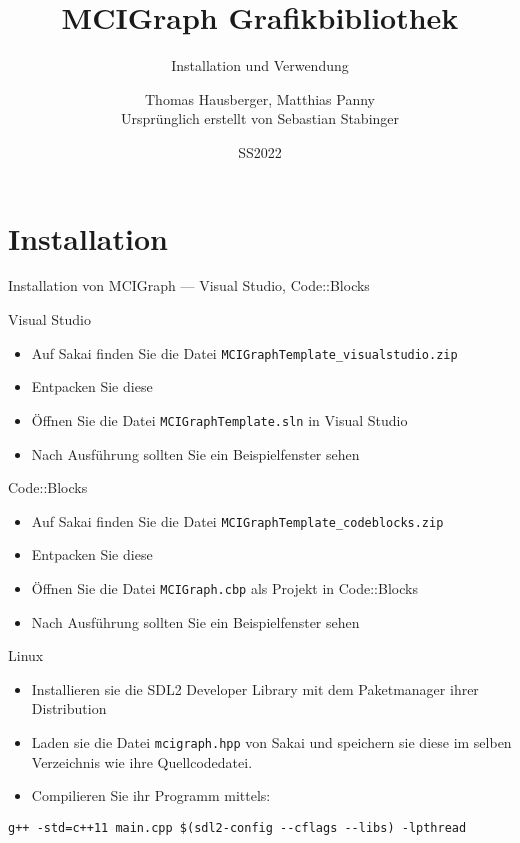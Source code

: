 \documentclass[presentation]{beamer}
\author{Thomas Hausberger, Matthias Panny \\ Ursprünglich erstellt von Sebastian Stabinger}
\date{SS2022}
\title{MCIGraph Grafikbibliothek}
\subtitle{Installation und Verwendung}
\begin{document}
\maketitle

\section{Installation}
\label{sec:org8478c46}
\begin{frame}[label={sec:orgbddcc05},fragile]{Installation von MCIGraph --- Visual Studio, Code::Blocks}
 \begin{block}{Visual Studio}
\begin{itemize}
\item Auf Sakai finden Sie die Datei {\color{solarizedYellow}\verb!MCIGraphTemplate_visualstudio.zip!}
\item Entpacken Sie diese
\item Öffnen Sie die Datei {\color{solarizedYellow}\verb!MCIGraphTemplate.sln!} in Visual Studio
\item Nach Ausführung sollten Sie ein Beispielfenster sehen
\end{itemize}
\end{block}
\begin{block}{Code::Blocks}
\begin{itemize}
\item Auf Sakai finden Sie die Datei {\color{solarizedYellow}\verb!MCIGraphTemplate_codeblocks.zip!}
\item Entpacken Sie diese
\item Öffnen Sie die Datei {\color{solarizedYellow}\verb!MCIGraph.cbp!} als Projekt in Code::Blocks
\item Nach Ausführung sollten Sie ein Beispielfenster sehen
\end{itemize}
\end{block}
\end{frame}
\begin{frame}[label={sec:orgf62367e},fragile]{Linux}
 \begin{itemize}
\item Installieren sie die SDL2 Developer Library mit dem Paketmanager
ihrer Distribution
\item Laden sie die Datei {\color{solarizedYellow}\verb!mcigraph.hpp!} von Sakai und speichern sie diese
im selben Verzeichnis wie ihre Quellcodedatei.
\item Compilieren Sie ihr Programm mittels:
\end{itemize}
\begin{verbatim}
g++ -std=c++11 main.cpp $(sdl2-config --cflags --libs) -lpthread
\end{verbatim}
\end{frame}
\end{document}
